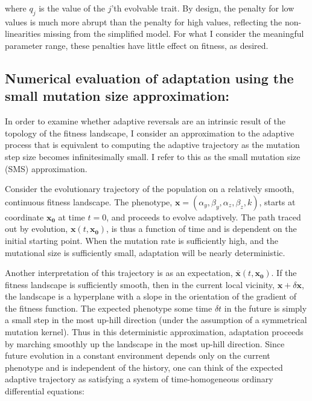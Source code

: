 \documentclass[dvips,12pt,twoside,titlepage]{article}
\begin{document}
\vspace{0.6cm}

\noindent where $q_j$ is the value of the $j$'th evolvable trait. 
By design, the penalty for low values is much more abrupt than the penalty for high values, reflecting the non-linearities missing from the simplified model. 
For what I consider the meaningful parameter range, these penalties have little effect on fitness, as desired. 

\subsection*{Numerical evaluation of adaptation using the small mutation size approximation:}

In order to examine whether adaptive reversals are an intrinsic result of the topology of the fitness landscape, I consider an approximation to the adaptive process that is equivalent to computing the adaptive trajectory as the mutation step size becomes infinitesimally small. 
I refer to this as the small mutation size (SMS) approximation. 

Consider the evolutionary trajectory of the population on a relatively smooth, continuous fitness landscape. 
The phenotype, $\mathbf{x} = \left(\alpha_y, \beta_y, \alpha_z, \beta_z, k\right)$, starts at coordinate $\mathbf{x_0}$ at time $t=0$, and proceeds to evolve adaptively. 
The path traced out by evolution, $\mathbf{x}(t,\mathbf{x_0})$, is thus a function of time and is dependent on the initial starting point. 
When the mutation rate is sufficiently high, and the mutational size is sufficiently small, adaptation will be nearly deterministic. 

Another interpretation of this trajectory is as an expectation, $\mathbf{\bar{x}}(t,\mathbf{x_0})$.
If the fitness landscape is sufficiently smooth, then in the current local vicinity, $\mathbf{x} + \delta \mathbf{x}$, the landscape is a hyperplane with a slope in the orientation of the gradient of the fitness function. 
The expected phenotype some time $\delta t$ in the future is simply a small step in the most up-hill direction (under the assumption of a symmetrical mutation kernel). Thus in this deterministic approximation, adaptation proceeds by marching smoothly up the landscape in the most up-hill direction.
Since future evolution in a constant environment depends only on the current phenotype and is independent of the history, one can think of the expected adaptive trajectory as satisfying a system of time-homogeneous ordinary differential equations:
\end{document}
